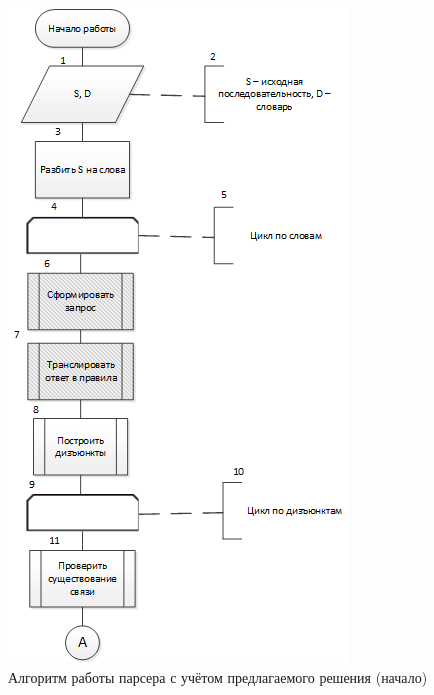 \begin{figure}[H]
	\centering
		\includegraphics[scale=1.0]{images/modifiedalgorithmA.png}
	\caption{\small Алгоритм работы парсера с учётом предлагаемого решения (начало)}
	\label{fig:modifiedalgorithmA}
\end{figure}

